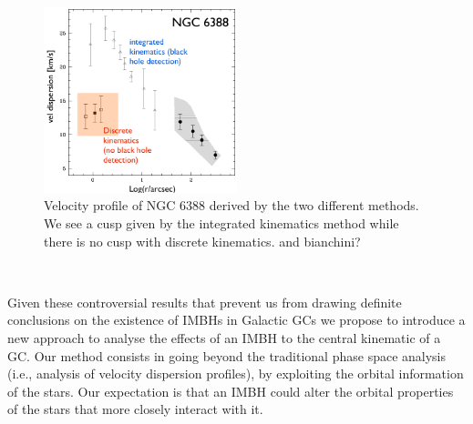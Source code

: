 \begin{figure}
\centering
\includegraphics[width=0.5\textwidth]{Plots/Paolo_talk_plot.png}
\caption{Velocity profile of NGC 6388 derived by the two different methods. We see a cusp given by the integrated kinematics method while there is no cusp with discrete kinematics. \citep{2013ApJ...769..107L} \color{red}and bianchini?\color{black}}
\label{fig:NGC6388}
\end{figure}\
\par Given these controversial results that prevent us from drawing definite conclusions on the existence of \acp{IMBH} in Galactic \acp{GC} we propose to introduce a new approach to analyse the effects of an \ac{IMBH} to the central kinematic of a \ac{GC}. Our method consists in going beyond the traditional phase space analysis (i.e., analysis of velocity dispersion profiles), by exploiting the orbital information of the stars. Our expectation is that an \ac{IMBH} could alter the orbital properties of the stars that more closely interact with it.
\\


